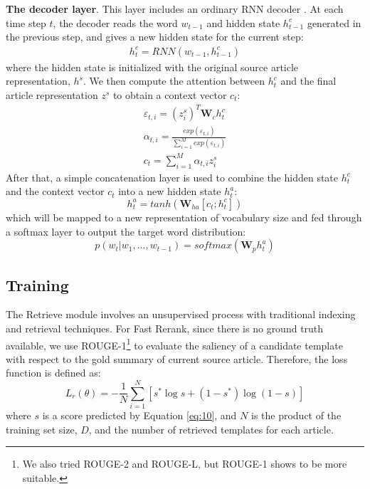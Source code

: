 \documentclass[11pt,a4paper]{article}
\begin{document}
\begin{spacing}{1.0}
\noindent\textbf{The decoder layer}. This layer includes an ordinary RNN decoder \cite{Luong2015Effective}. At each time step $t$, the decoder reads the word $w_{t-1}$ and hidden state $h_{t-1}^c$ generated in the previous step, and gives a new hidden state for the current step:
\begin{gather}
	h_t^c=RNN(w_{t-1},h_{t-1}^c)
\end{gather}
where the hidden state is initialized with the original source article representation, $h^s$. We then compute the attention between $h_t^c$ and the final article representation $z^s$ to obtain a context vector $c_t$:
\begin{gather}
    \varepsilon_{t,i}=(z_i^s)^T\textbf{W}_ch_t^c\\
	\alpha_{t,i}=\frac{exp(\varepsilon_{t,i})}{\sum_{i=1}^{M}exp(\varepsilon_{t,i})}\\
   c_t=\sum\limits_{i=1}^M\alpha_{t,i}z_i^s
\end{gather}
After that, a simple concatenation layer is used to combine the hidden state $h_t^c$ and the context vector $c_t$ into a new hidden state $h_t^a$:
\begin{equation}
   h_t^a=tanh(\textbf{W}_{ha}[c_t;h_t^c])
\end{equation}
which will be mapped to a new representation of vocabulary size and fed through a softmax layer to output the target word distribution:
\begin{equation}
   p(w_t|w_1,...,w_{t-1})=softmax(\textbf{W}_p h_t^a)
\end{equation}


\subsection{Training}
The Retrieve module involves an unsupervised process with traditional indexing and retrieval techniques. For Fast Rerank, since there is no ground truth available, we use ROUGE-1\footnote{We also tried ROUGE-2 and ROUGE-L, but ROUGE-1 shows to be more suitable.} \cite{Lin2003Automatic} to evaluate the saliency of a candidate template with respect to the gold summary of current source article. Therefore, the loss function is defined as:
\begin{equation}
L_r(\theta)=-\frac{1}{N}\sum\limits_{i=1}^N[s^*\log s+(1-s^*)\log(1-s)]
\end{equation}
where $s$ is a score predicted by Equation \ref{eq:10}, and $N$ is the product of the training set size, $D$, and the number of retrieved templates for each article.


\end{spacing}
\end{document}
